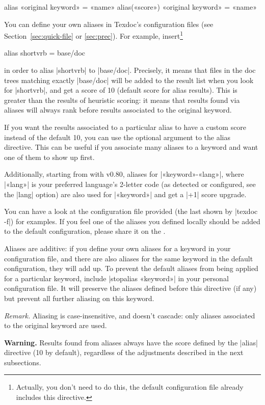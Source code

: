 \documentclass[draft]{texdoc-doc}
\begin{document}
\begin{htcode}
alias «original keyword» = «name»
alias(«score») «original keyword» = «name»
\end{htcode}
%
You can define your own aliases in Texdoc's configuration files (see
Section~\ref{sec:quick-file} or \ref{sec:prec}). For example,
insert\footnote{Actually, you don't need to do this, the default configuration
file already includes this directive.}
%
\begin{htcode}
alias shortvrb = base/doc
\end{htcode}
%
in order to alias |shortvrb| to |base/doc|. Precisely, it means that files in
the doc trees matching exactly |base/doc| will be added to the result list
when you look for |shortvrb|, and get a score of 10 (default score for alias
results). This is greater than the results of heuristic scoring: it means that
results found via aliases will always rank before results associated to the
original keyword.

If you want the results associated to a particular alias to have a custom
score instead of the default 10, you can use the optional argument to the
alias directive. This can be useful if you associate many aliases to
a keyword and want one of them to show up first.

Additionally, starting from with v0.80, aliases for |«keyword»-«lang»|, where
|«lang»| is your preferred language's 2-letter code (as detected or
configured, see the |lang| option) are also used for |«keyword»| and get a
|+1| score upgrade.

You can have a look at the configuration file provided (the last shown by
|texdoc -f|) for examples. If you feel one of the aliases you defined locally
should be added to the default configuration, please share it on the
{\TexdocML}.

Aliases are additive: if you define your own aliases for a keyword in your
configuration file, and there are also aliases for the same keyword in the
default configuration, they will add up. To prevent the default aliases
from being applied for a particular keyword, include |stopalias «keyword»| in
your personal configuration file. It will preserve the aliases defined before
this directive (if any) but prevent all further aliasing on this keyword.

\textit{Remark.} Aliasing is case-insensitive, and doesn't cascade:
only aliases associated to the original keyword are used.

\textbf{Warning.} Results found from aliases always have the score defined by
the |alias| directive (10 by default), regardless of the adjustments described
in the next subsections.
\end{document}
